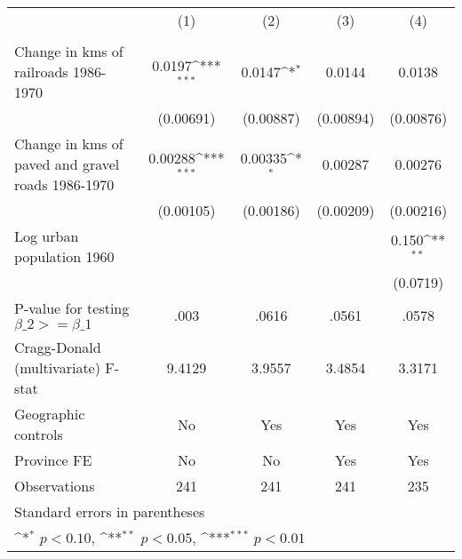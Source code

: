 {
\def\sym#1{\ifmmode^{#1}\else\(^{#1}\)\fi}
\begin{tabular}{l*{4}{c}}
\hline\hline
                &\multicolumn{1}{c}{(1)}&\multicolumn{1}{c}{(2)}&\multicolumn{1}{c}{(3)}&\multicolumn{1}{c}{(4)}\\
                &\multicolumn{1}{c}{}&\multicolumn{1}{c}{}&\multicolumn{1}{c}{}&\multicolumn{1}{c}{}\\
\hline
Change in kms of railroads 1986-1970&   0.0197\sym{***}&   0.0147\sym{*}  &   0.0144         &   0.0138         \\
                &(0.00691)         &(0.00887)         &(0.00894)         &(0.00876)         \\
[1em]
Change in kms of paved and gravel roads 1986-1970&  0.00288\sym{***}&  0.00335\sym{*}  &  0.00287         &  0.00276         \\
                &(0.00105)         &(0.00186)         &(0.00209)         &(0.00216)         \\
[1em]
Log urban population 1960&                  &                  &                  &    0.150\sym{**} \\
                &                  &                  &                  & (0.0719)         \\
\hline
P-value for testing $\beta\_{2} >= \beta\_{1}$&     .003         &    .0616         &    .0561         &    .0578         \\
Cragg-Donald (multivariate) F-stat&   9.4129         &   3.9557         &   3.4854         &   3.3171         \\
Geographic controls&       No         &      Yes         &      Yes         &      Yes         \\
Province FE     &       No         &       No         &      Yes         &      Yes         \\
Observations    &      241         &      241         &      241         &      235         \\
\hline\hline
\multicolumn{5}{l}{\footnotesize Standard errors in parentheses}\\
\multicolumn{5}{l}{\footnotesize \sym{*} \(p<0.10\), \sym{**} \(p<0.05\), \sym{***} \(p<0.01\)}\\
\end{tabular}
}
